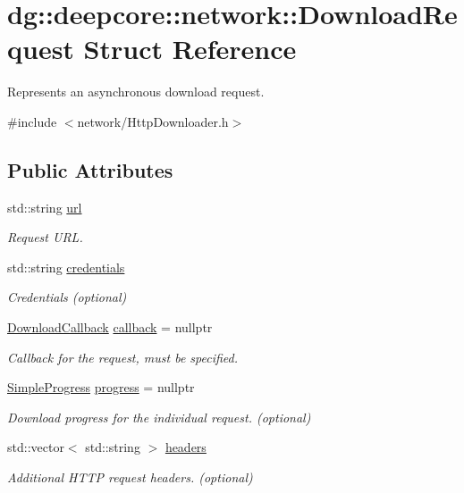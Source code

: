 \hypertarget{structdg_1_1deepcore_1_1network_1_1_download_request}{}\section{dg\+:\+:deepcore\+:\+:network\+:\+:Download\+Request Struct Reference}
\label{structdg_1_1deepcore_1_1network_1_1_download_request}


Represents an asynchronous download request.  




{\ttfamily \#include $<$network/\+Http\+Downloader.\+h$>$}

\subsection*{Public Attributes}
\begin{DoxyCompactItemize}
\item 
std\+::string \hyperlink{structdg_1_1deepcore_1_1network_1_1_download_request_a27a77bb34f9c7a50280643a7f5642645}{url}
\begin{DoxyCompactList}\small\item\em Request U\+RL. \end{DoxyCompactList}\item 
std\+::string \hyperlink{structdg_1_1deepcore_1_1network_1_1_download_request_a658bf11041a4e59708e11a03586a3cc8}{credentials}
\begin{DoxyCompactList}\small\item\em Credentials (optional) \end{DoxyCompactList}\item 
\hyperlink{group___network_module_ga4d618c88e9b1e6e961f70621dc9aab41}{Download\+Callback} \hyperlink{structdg_1_1deepcore_1_1network_1_1_download_request_adb453a945c53898c25e110d81c0d2369}{callback} = nullptr
\begin{DoxyCompactList}\small\item\em Callback for the request, must be specified. \end{DoxyCompactList}\item 
\hyperlink{group___utility_module_ga6763018df79e4bdbcd8cd14cea5342b2}{Simple\+Progress} \hyperlink{structdg_1_1deepcore_1_1network_1_1_download_request_ac2c22b1c491ff60d2ac5e15419b1b04b}{progress} = nullptr
\begin{DoxyCompactList}\small\item\em Download progress for the individual request. (optional) \end{DoxyCompactList}\item 
std\+::vector$<$ std\+::string $>$ \hyperlink{structdg_1_1deepcore_1_1network_1_1_download_request_a155aa5c32169a6bf6d47fec321672f4e}{headers}
\begin{DoxyCompactList}\small\item\em Additional H\+T\+TP request headers. (optional) \end{DoxyCompactList}\end{DoxyCompactItemize}


